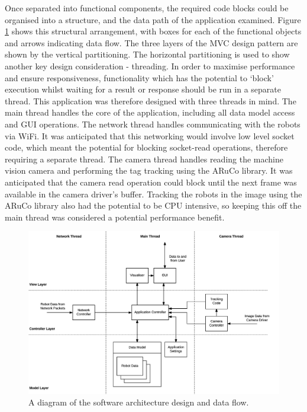 Once separated into functional components, the required code blocks could be organised into a structure, and the data path of the application examined. Figure \ref{fig:SoftwareArchitecture} shows this structural arrangement, with boxes for each of the functional objects and arrows indicating data flow. The three layers of the MVC design pattern are shown by the vertical partitioning. The horizontal partitioning is used to show another key design consideration - threading. In order to maximise performance and ensure responsiveness, functionality which has the potential to `block' execution whilst waiting for a result or response should be run in a separate thread. This application was therefore designed with three threads in mind. The main thread handles the core of the application, including all data model access and GUI operations. The network thread handles communicating with the robots via WiFi. It was anticipated that this networking would involve low level socket code, which meant the potential for blocking socket-read operations, therefore requiring a separate thread. The camera thread handles reading the machine vision camera and performing the tag tracking using the ARuCo library. It was anticipated that the camera read operation could block until the next frame was available in the camera driver's buffer. Tracking the robots in the image using the ARuCo library also had the potential to be CPU intensive, so keeping this off the main thread was considered a potential performance benefit.

\begin{figure}
	\centering
	\includegraphics[scale=0.7]{Figures/SoftwareArchitecture.png}
	\decoRule
	\caption[Software Architecture Diagram]{A diagram of the software architecture design and data flow.}
	\label{fig:SoftwareArchitecture}
\end{figure}

